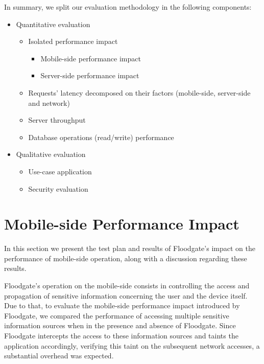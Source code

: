 In summary,  we split our evaluation methodology in the following components:

\begin{itemize}
\item Quantitative evaluation
\begin{itemize}
\item Isolated performance impact
\begin{itemize}
\item Mobile-side performance impact
\item Server-side performance impact
\end{itemize}
\item Requests' latency decomposed on their factors (mobile-side, server-side and network)
\item Server throughput
\item Database operations (read/write) performance
\end{itemize}
\item Qualitative evaluation
\begin{itemize}
\item Use-case application
\item Security evaluation
\end{itemize}
\end{itemize}

\section{Mobile-side Performance Impact}
\label{sec:mobile-performance}

In this section we present the test plan and results of Floodgate's impact on the performance of mobile-side operation, along with a discussion regarding these results.

Floodgate's operation on the mobile-side consists in controlling the access and propagation of sensitive information concerning the user and the device itself. Due to that, to evaluate the mobile-side performance impact introduced by Floodgate, we compared the performance of accessing multiple sensitive information sources when in the presence and absence of Floodgate. Since Floodgate intercepts the access to these information sources and taints the application accordingly, verifying this taint on the subsequent network accesses, a substantial overhead was expected.

